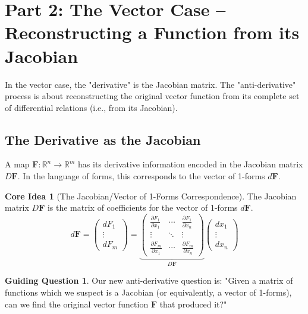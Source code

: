 \documentclass[12pt, letterpaper]{article}
\theoremstyle{definition}
\newtheorem{idea}{Core Idea}[section]
\newtheorem{question}{Guiding Question}[section]
\begin{document}
	\section{Part 2: The Vector Case -- Reconstructing a Function from its Jacobian}
	
	In the vector case, the "derivative" is the Jacobian matrix. The "anti-derivative" process is about reconstructing the original vector function from its complete set of differential relations (i.e., from its Jacobian).
	
	\subsection{The Derivative as the Jacobian}
	A map $\mathbf{F}: \mathbb{R}^n \to \mathbb{R}^m$ has its derivative information encoded in the Jacobian matrix $D\mathbf{F}$. In the language of forms, this corresponds to the vector of 1-forms $d\mathbf{F}$.
	
	\begin{idea}[The Jacobian/Vector of 1-Forms Correspondence]
		The Jacobian matrix $D\mathbf{F}$ is the matrix of coefficients for the vector of 1-forms $d\mathbf{F}$.
		\begin{equation*}
			d\mathbf{F} = \begin{pmatrix} dF_1 \\ \vdots \\ dF_m \end{pmatrix} = \underbrace{
				\begin{pmatrix}
					\frac{\partial F_1}{\partial x_1} & \cdots & \frac{\partial F_1}{\partial x_n} \\
					\vdots & \ddots & \vdots \\
					\frac{\partial F_m}{\partial x_1} & \cdots & \frac{\partial F_m}{\partial x_n}
				\end{pmatrix}
			}_{D\mathbf{F}}
			\begin{pmatrix} dx_1 \\ \vdots \\ dx_n \end{pmatrix}
		\end{equation*}
	\end{idea}
	
	\begin{question}
		Our new anti-derivative question is: "Given a matrix of functions which we suspect is a Jacobian (or equivalently, a vector of 1-forms), can we find the original vector function $\mathbf{F}$ that produced it?"
	\end{question}
	
\end{document}
